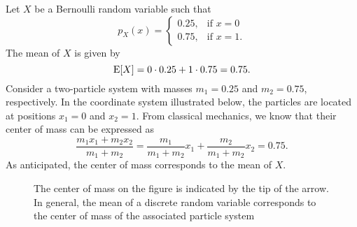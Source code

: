 \begin{example}
Let $X$ be a Bernoulli random variable such that
\begin{equation*}
p_X (x) = \begin{cases}
0.25, & \text{if }x = 0 \\
0.75, & \text{if }x = 1.
\end{cases}
\end{equation*}
The mean of $X$ is given by
\begin{equation*}
\mathrm{E} [X] = 0 \cdot 0.25 + 1 \cdot 0.75 = 0.75 .
\end{equation*}
Consider a two-particle system with masses $m_1 = 0.25$ and $m_2 = 0.75$, respectively.
In the coordinate system illustrated below, the particles are located at positions $x_1 = 0$ and $x_2 = 1$.
From classical mechanics, we know that their center of mass can be expressed as
\begin{equation*}
\frac{ m_1 x_1 + m_2 x_2 }{ m_1 + m_2 }
 = \frac{ m_1 }{ m_1 + m_2 } x_1 + \frac{ m_2 }{ m_1 + m_2 } x_2
 = 0.75 .
\end{equation*}
As anticipated, the center of mass corresponds to the mean of $X$.

\begin{figure}[ht]
\begin{center}
\begin{footnotesize}
\end{footnotesize}
\caption{The center of mass on the figure is indicated by the tip of the arrow.
In general, the mean of a discrete random variable corresponds to the center of mass of the associated particle system}
\end{center}
\end{figure}
\end{example}


